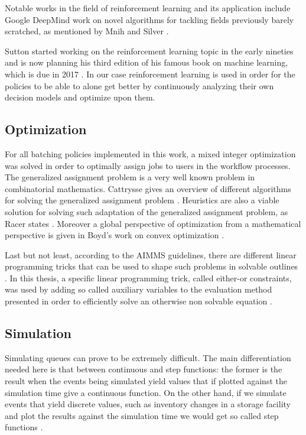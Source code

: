 \documentclass{seal_thesis}
\begin{document}
Notable works in the field of reinforcement learning and its application include Google DeepMind work on novel algorithms for tackling fields previously barely scratched, as mentioned by Mnih \etal and Silver \etal \cite{Mnih2015,Silver2016}.

Sutton started working on the reinforcement learning topic in the early nineties and is now planning his third edition of his famous book on machine learning, which is due in 2017 \cite{Sutton1998}. In our case reinforcement learning is used in order for the policies to be able to alone get better by continuously analyzing their own decision models and optimize upon them.

\subsection{Optimization}

For all batching policies implemented in this work, a mixed integer optimization was solved in order to optimally assign jobs to users in the workflow processes. The generalized assignment problem is a very well known problem in combinatorial mathematics. Cattrysse gives an overview of different algorithms for solving the generalized assignment problem \cite{Cattrysse1992}. Heuristics are also a viable solution for solving such adaptation of the generalized assignment problem, as Racer states \cite{Racer1994}. Moreover a global perspective of optimization from a mathematical perspective is given in Boyd's work on convex optimization \cite{Boyd2004}.

Last but not least, according to the AIMMS guidelines, there are different linear programming tricks that can be used to shape such problems in solvable outlines \cite{Bisschop2016}. In this thesis, a specific linear programming trick, called either-or constraints, was used by adding so called auxiliary variables to the evaluation method presented in order to efficiently solve an otherwise non solvable equation \cite[p. 77]{Bisschop2016}.

\subsection{Simulation}

Simulating queues can prove to be extremely difficult. The main differentiation needed here is that between continuous and step functions: the former is the result when the events being simulated yield values that if plotted against the simulation time give a continuous function. On the other hand, if we simulate events that yield discrete values, such as inventory changes in a storage facility and plot the results against the simulation time we would get so called step functions \cite{Matloff2008}.
\end{document}
